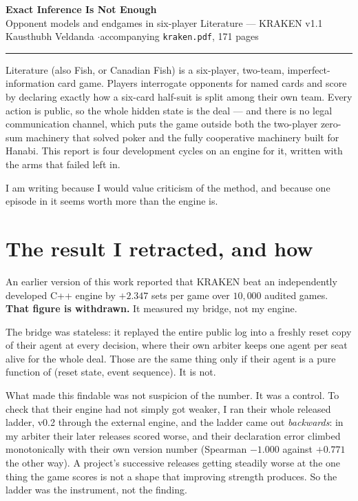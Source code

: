 \documentclass[11pt,a4paper]{article}
\begin{document}
{\bfseries\large Exact Inference Is Not Enough}\\[0.15em]
{\normalsize Opponent models and endgames in six-player Literature ---
KRAKEN v1.1}\\[0.35em]
{\small Kausthubh Veldanda \quad$\cdot$\quad accompanying
\texttt{kraken.pdf}, 171 pages}

\vspace{0.4em}
\hrule
\vspace{0.2em}

Literature (also Fish, or Canadian Fish) is a six-player, two-team,
imperfect-information card game. Players interrogate opponents for named cards
and score by declaring exactly how a six-card half-suit is split among their
own team. Every action is public, so the whole hidden state is the deal --- and
there is no legal communication channel, which puts the game outside both the
two-player zero-sum machinery that solved poker and the fully cooperative
machinery built for Hanabi. This report is four development cycles on an engine
for it, written with the arms that failed left in.

I am writing because I would value criticism of the method, and because one
episode in it seems worth more than the engine is.

\section{The result I retracted, and how}

An earlier version of this work reported that KRAKEN beat an independently
developed C++ engine by $+2.347$ sets per game over $10{,}000$ audited games.
\textbf{That figure is withdrawn.} It measured my bridge, not my engine.

The bridge was stateless: it replayed the entire public log into a freshly
reset copy of their agent at every decision, where their own arbiter keeps one
agent per seat alive for the whole deal. Those are the same thing only if their
agent is a pure function of (reset state, event sequence). It is not.

What made this findable was not suspicion of the number. It was a control. To
check that their engine had not simply got weaker, I ran their whole released
ladder, v0.2 through the external engine, and the ladder came out \emph{backwards}: in my
arbiter their later releases scored worse, and their declaration error climbed
monotonically with their own version number (Spearman $-1.000$ against $+0.771$
the other way). A project's successive releases getting steadily worse at the
one thing the game scores is not a shape that improving strength produces. So
the ladder was the instrument, not the finding.
\end{document}
